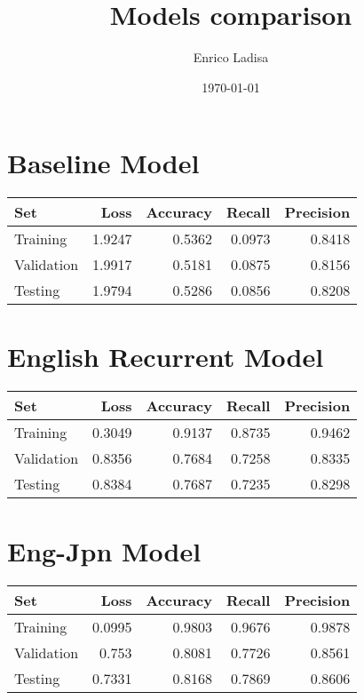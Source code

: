 \documentclass{article}%
\title{Models comparison}%
\author{Enrico Ladisa}%
\date{\today}%
\begin{document}
%
\normalsize%
\maketitle%
\section{Baseline Model}%
\label{sec:BaselineModel}%
\begin{center}%
\begin{tabular}[centered]{l||r r r r}%
Set&Loss&Accuracy&Recall&Precision\\%
\hline%
\hline%
Training&1.9247&0.5362&0.0973&0.8418\\%
Validation&1.9917&0.5181&0.0875&0.8156\\%
Testing&1.9794&0.5286&0.0856&0.8208\\%
\end{tabular}%
\end{center}

%
\section{English Recurrent Model}%
\label{sec:EnglishRecurrentModel}%
\begin{center}%
\begin{tabular}[centered]{l||r r r r}%
Set&Loss&Accuracy&Recall&Precision\\%
\hline%
\hline%
Training&0.3049&0.9137&0.8735&0.9462\\%
Validation&0.8356&0.7684&0.7258&0.8335\\%
Testing&0.8384&0.7687&0.7235&0.8298\\%
\end{tabular}%
\end{center}

%
\section{Eng{-}Jpn Model}%
\label{sec:Eng{-}JpnModel}%
\begin{center}%
\begin{tabular}[centered]{l||r r r r}%
Set&Loss&Accuracy&Recall&Precision\\%
\hline%
\hline%
Training&0.0995&0.9803&0.9676&0.9878\\%
Validation&0.753&0.8081&0.7726&0.8561\\%
Testing&0.7331&0.8168&0.7869&0.8606\\%
\end{tabular}%
\end{center}
\end{document}
